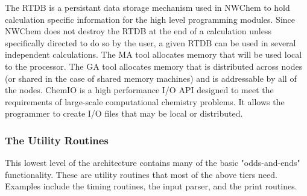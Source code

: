 The RTDB is a persistant data storage mechanism used in NWChem
to hold calculation specific information for the high level
programming modules.  Since NWChem does not destroy the RTDB at the end of
a calculation unless specifically directed to do so by the user, 
a given RTDB can be used in several independent
calculations.  The MA tool allocates memory that will be used local to
the processor.  The GA tool allocates memory that is distributed across
nodes (or shared in the case of shared memory machines) and is addressable
by all of the nodes.  ChemIO is a high performance I/O API 
designed to meet the requirements of large-scale computational
chemistry problems.  It allows the programmer to 
create I/O files that may be local or distributed.

\subsubsection{The Utility Routines}

This lowest level of the architecture contains many of the basic 
"odds-and-ends" functionality.
These are utility routines that most of the
above tiers need.
Examples include the timing routines,
the input parser, 
and the print routines.


